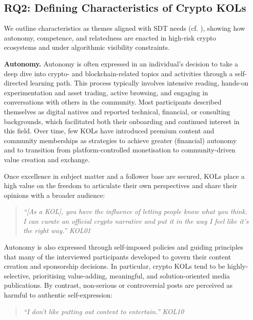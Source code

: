 \subsection{RQ2: Defining Characteristics of Crypto KOLs}\label{sec:rq2}

We outline characteristics as themes aligned with SDT needs (cf. ), showing how autonomy, competence, and relatedness are enacted in high-risk crypto ecosystems and under algorithmic visibility constraints.

\noindent\textbf{Autonomy.}
Autonomy is often expressed in an individual's decision to take a deep dive into crypto- and blockchain-related topics and activities through a self-directed learning path. This process typically involves intensive reading, hands-on experimentation and asset trading, active browsing, and engaging in conversations with others in the community. Most participants described themselves as digital natives and reported technical, financial, or consulting backgrounds, which facilitated both their onboarding and continued interest in this field. Over time, few KOLs have introduced premium content and community memberships as strategies to achieve greater (financial) autonomy and to transition from platform-controlled monetisation to community-driven value creation and exchange.

Once excellence in subject matter and a follower base are secured, KOLs place a high value on the freedom to articulate their own perspectives and share their opinions with a broader audience:
\begin{quote}\itshape
``[As a KOL], you have the influence of letting people know what you think. I can curate an official crypto narrative and put it in the way I feel like it's the right way.'' \textemdash{} KOL01
\end{quote}

Autonomy is also expressed through self-imposed policies and guiding principles that many of the interviewed participants developed to govern their content creation and sponsorship decisions. In particular, crypto KOLs tend to be highly-selective, prioritising value-adding, meaningful, and solution-oriented media publications. By contrast, non-serious or controversial posts are perceived as harmful to authentic self-expression:
\begin{quote}\itshape
``I don't like putting out content to entertain.'' \textemdash{} KOL10
\end{quote}


